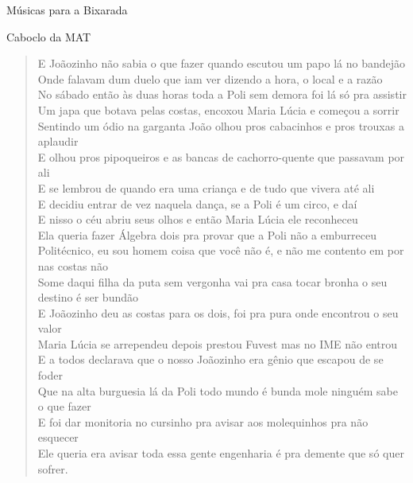 \begin{secao}{Músicas para a Bixarada}
\begin{subsecao}{Caboclo da MAT}
\begin{verse}
{E Joãozinho não sabia o que fazer quando escutou um papo lá no bandejão\\
Onde falavam dum duelo que iam ver dizendo a hora, o local e a razão\\
No sábado então às duas horas toda a Poli sem demora foi lá só pra assistir\\
Um japa que botava pelas costas, encoxou Maria Lúcia e começou a sorrir\\
Sentindo um ódio na garganta João olhou pros cabacinhos e pros trouxas a
aplaudir\\
E olhou pros pipoqueiros e as bancas de cachorro-quente que passavam por ali\\
E se lembrou de quando era uma criança e de tudo que vivera até ali\\
E decidiu entrar de vez naquela dança, se a Poli é um circo, e daí\\
E nisso o céu abriu seus olhos e então Maria Lúcia ele reconheceu\\
Ela queria fazer Álgebra dois pra provar que a Poli não a emburreceu\\
Politécnico, eu sou homem coisa que você não é, e não me contento em por nas
costas não\\
Some daqui filha da puta sem vergonha vai pra casa tocar bronha o seu destino é
ser bundão\\
E Joãozinho deu as costas para os dois, foi pra pura onde encontrou o seu valor\\
Maria Lúcia se arrependeu depois prestou Fuvest mas no IME não entrou\\
E a todos declarava que o nosso Joãozinho era gênio que escapou de se foder\\
Que na alta burguesia lá da Poli todo mundo é bunda mole ninguém sabe o que
fazer\\
E foi dar monitoria no cursinho pra avisar aos molequinhos pra não esquecer\\
Ele queria era avisar toda essa gente engenharia é pra demente que só quer
sofrer.\\
}
\end{verse}
\end{subsecao}

\end{secao}
